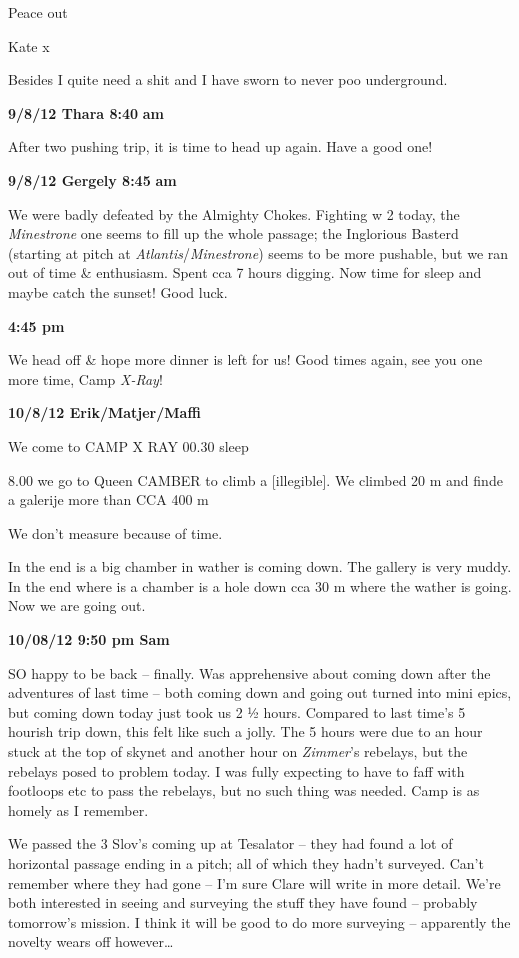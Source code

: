 Peace out

Kate x

Besides I quite need a shit and I have sworn to never poo underground.

\textbf{9/8/12 Thara 8:40} \textbf{am}

After two pushing trip, it is time to head up again. Have a good one!

\textbf{9/8/12 Gergely 8:45} \textbf{am}

We were badly defeated by the Almighty Chokes. Fighting w 2 today, the
\emph{Minestrone} one seems to fill up the whole passage; the Inglorious
Basterd (starting at pitch at \emph{Atlantis}/\emph{Minestrone}) seems
to be more pushable, but we ran out of time \& enthusiasm. Spent cca 7
hours digging. Now time for sleep and maybe catch the sunset! Good luck.

\textbf{4:45 pm}

We head off \& hope more dinner is left for us! Good times again, see
you one more time, Camp \emph{X-Ray}!

\textbf{10/8/12 Erik/Matjer/Maffi}

We come to CAMP X RAY 00.30 sleep

8.00 we go to Queen CAMBER to climb a {[}illegible{]}. We climbed 20 m
and finde a galerije more than CCA 400 m

We don't measure because of time.

In the end is a big chamber in wather is coming down. The gallery is
very muddy. In the end where is a chamber is a hole down cca 30 m where
the wather is going. Now we are going out.

\textbf{10/08/12 9:50 pm Sam}

SO happy to be back -- finally. Was apprehensive about coming down after
the adventures of last time -- both coming down and going out turned
into mini epics, but coming down today just took us 2 ½ hours. Compared
to last time's 5 hourish trip down, this felt like such a jolly. The 5
hours were due to an hour stuck at the top of skynet and another hour on
\emph{Zimmer}'s rebelays, but the rebelays posed to problem today. I was
fully expecting to have to faff with footloops etc to pass the rebelays,
but no such thing was needed. Camp is as homely as I remember.

We passed the 3 Slov's coming up at Tesalator -- they had found a lot of
horizontal passage ending in a pitch; all of which they hadn't surveyed.
Can't remember where they had gone -- I'm sure Clare will write in more
detail. We're both interested in seeing and surveying the stuff they
have found -- probably tomorrow's mission. I think it will be good to do
more surveying -- apparently the novelty wears off however\ldots{}

